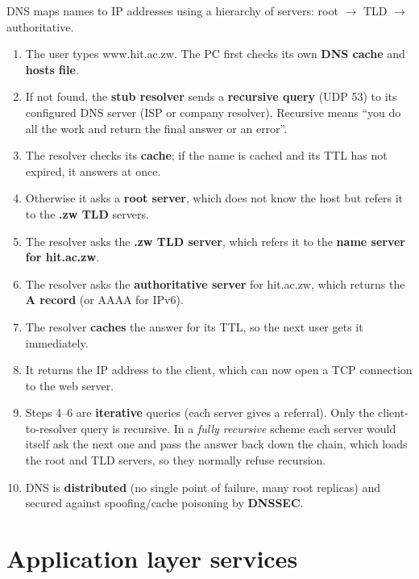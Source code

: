 \documentclass[10pt]{article}
\begin{document}
\begin{ans}
DNS maps names to IP addresses using a hierarchy of servers: root $\to$ TLD $\to$ authoritative.
\begin{enumerate}
\item The user types www.hit.ac.zw. The PC first checks its own \textbf{DNS cache} and \textbf{hosts file}.
\item If not found, the \textbf{stub resolver} sends a \textbf{recursive query} (UDP 53) to its configured DNS server (ISP or company resolver). Recursive means ``you do all the work and return the final answer or an error''.
\item The resolver checks its \textbf{cache}; if the name is cached and its TTL has not expired, it answers at once.
\item Otherwise it asks a \textbf{root server}, which does not know the host but refers it to the \textbf{.zw TLD} servers.
\item The resolver asks the \textbf{.zw TLD server}, which refers it to the \textbf{name server for hit.ac.zw}.
\item The resolver asks the \textbf{authoritative server} for hit.ac.zw, which returns the \textbf{A record} (or AAAA for IPv6).
\item The resolver \textbf{caches} the answer for its TTL, so the next user gets it immediately.
\item It returns the IP address to the client, which can now open a TCP connection to the web server.
\item Steps 4--6 are \textbf{iterative} queries (each server gives a referral). Only the client-to-resolver query is recursive. In a \emph{fully recursive} scheme each server would itself ask the next one and pass the answer back down the chain, which loads the root and TLD servers, so they normally refuse recursion.
\item DNS is \textbf{distributed} (no single point of failure, many root replicas) and secured against spoofing/cache poisoning by \textbf{DNSSEC}.
\end{enumerate}
\end{ans}

\section{Application layer services}
\end{document}
